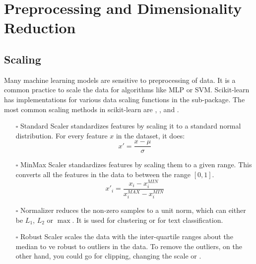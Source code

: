 \documentclass{article}
\newcommand{\code}[1]{{\fontfamily{zi4} \selectfont{#1}}}
\begin{document}
\section{Preprocessing and Dimensionality Reduction}

\subsection{Scaling}
Many machine learning models are sensitive to preprocessing of data. It is a common practice to scale the data for algorithms like MLP or SVM. Scikit-learn has implementations for various data scaling functions in the \code{sklearn.preprocessing} sub-package. The most common scaling methods in scikit-learn are \code{StandardScaler}, \code{MinMaxScaler}, \code{Normalizer} and \code{RobustScaler}. 

\begin{itemize}
\item[$\square$] Standard Scaler standardizes features by scaling it to a standard normal distribution. For every feature $x$ in the dataset, it does:
$$x' = \frac{x-\mu}{\sigma}$$
\item[$\square$] MinMax Scaler standardizes features by scaling them to a given range. This converts all the features in the data to between the range $[0, 1]$.
$$x'_i = \frac{x_i - x^{MIN}_i}{x^{MAX}_i - x^{MIN}_i}$$
\item[$\square$] Normalizer reduces the non-zero samples to a unit norm, which can either be $L_1$, $L_2$ or $\max$. It is used for clustering or for text classification.
\item[$\square$] Robust Scaler scales the data with the inter-quartile ranges about the median to ve robust to outliers in the data. To remove the outliers, on the other hand, you could go for clipping, changing the scale or \code{QuantileTransformer}.
\end{itemize}
\end{document}
